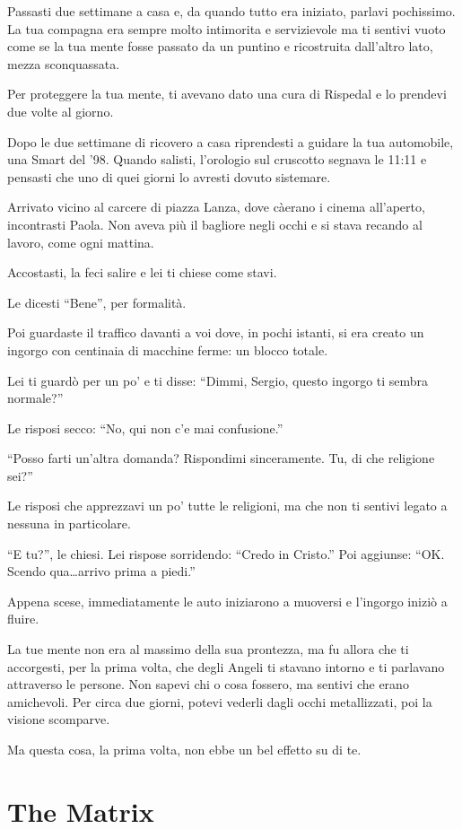 Passasti due settimane a casa e, da quando tutto era iniziato, parlavi pochissimo. La tua compagna era sempre molto intimorita e servizievole ma ti sentivi vuoto come se la tua mente fosse passato da un puntino e ricostruita dall'altro lato, mezza sconquassata.

Per proteggere la tua mente, ti avevano dato una cura di Rispedal e lo prendevi due volte al giorno.

Dopo le due settimane di ricovero a casa riprendesti a guidare la tua automobile, una Smart del '98. Quando salisti, l'orologio sul cruscotto segnava le 11:11 e pensasti che uno di quei giorni lo avresti dovuto sistemare.

Arrivato vicino al carcere di piazza Lanza, dove càerano i cinema all'aperto, incontrasti Paola. Non aveva più il bagliore negli occhi e si stava recando al lavoro, come ogni mattina.

Accostasti, la feci salire e lei ti chiese come stavi.

Le dicesti “Bene”, per formalità.

Poi guardaste il traffico davanti a voi dove, in pochi istanti, si era creato un ingorgo con centinaia di macchine ferme: un blocco totale.

Lei ti guardò per un po' e ti disse: “Dimmi, Sergio, questo ingorgo ti sembra normale?”

Le risposi secco: “No, qui non c'e mai confusione.”

“Posso farti un'altra domanda? Rispondimi sin\-ce\-ra\-mente. Tu, di che religione sei?”

Le risposi che apprezzavi un po' tutte le religioni, ma che non ti sentivi legato a nessuna in particolare.

“E tu?”, le chiesi. Lei rispose sorridendo: “Credo in Cristo.” Poi aggiunse: “OK. Scendo qua\ldots arrivo prima a piedi.”

Appena scese, immediatamente le auto iniziarono a muoversi e l'ingorgo iniziò a fluire.

La tue mente non era al massimo della sua prontezza, ma fu allora che ti accorgesti, per la prima volta, che degli Angeli ti stavano intorno e ti parlavano attraverso le persone. Non sapevi chi o cosa fossero, ma sentivi che erano amichevoli. Per circa due giorni, potevi vederli dagli occhi metallizzati, poi la visione scomparve.

Ma questa cosa, la prima volta, non ebbe un bel effetto su di te.

\section{The Matrix}
\label{the_matrix}

